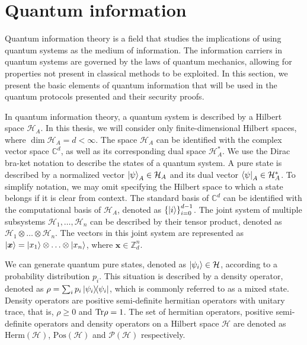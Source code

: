 \section{Quantum information}

Quantum information theory is a field that studies the implications of using quantum systems as the medium of information. The information carriers in quantum systems are governed by the laws of quantum mechanics, allowing for properties not present in classical methods to be exploited. In this section, we present the basic elements of quantum information that will be used in the quantum protocols presented and their security proofs.

In quantum information theory, a quantum system is described by a Hilbert space $\mathcal{H}_A$. In this thesis, we will consider only finite-dimensional Hilbert spaces, where $\dim \mathcal{H}_A = d < \infty$. The space $\mathcal{H}_A$ can be identified with the complex vector space $\mathbb{C}^d$, as well as its corresponding dual space $\mathcal{H}^{*}_A$. We use the Dirac bra-ket notation to describe the states of a quantum system. A pure state is described by a normalized vector $\ket{\psi}_A \in \mathcal{H}_A$ and its dual vector $\bra{\psi}_A \in \mathcal{H}^{*}_A$. To simplify notation, we may omit specifying the Hilbert space to which a state belongs if it is clear from context. The standard basis of $\mathbb{C}^d$ can be identified with the computational basis of $\mathcal{H}_A$, denoted as $\left\{ \ket{i} \right\}_{i=0}^{d-1}$. The joint system of multiple subsystems $\mathcal{H}_1, \ldots, \mathcal{H}_n$ can be described by their tensor product, denoted as $\mathcal{H}_1 \otimes \ldots \otimes \mathcal{H}_n$. The vectors in this joint system are represented as $\ket{\bm{x}} = \ket{x_1} \otimes \ldots \otimes \ket{x_n}$, where $\bm{x} \in \mathbb{Z}_d^n$.

We can generate quantum pure states, denoted as $\ket{\psi_i}\in \mathcal{H}$, according to a probability distribution ${p_i}$. This situation is described by a density operator, denoted as $\rho = \sum_i p_i \ketbra{\psi_i}$, which is commonly referred to as a mixed state. Density operators are positive semi-definite hermitian operators with unitary trace, that is, $\rho \geq 0$ and $\text{Tr} \rho = 1$. The set of hermitian operators, positive semi-definite operators and density operators on a Hilbert space $\mathcal{H}$ are denoted as $\text{Herm}(\mathcal{H})$, $\text{Pos}(\mathcal{H})$ and $\mathcal{P}(\mathcal{H})$ respectively.

